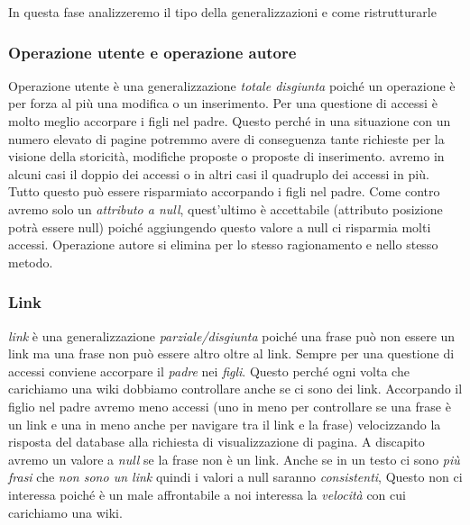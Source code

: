 In questa fase analizzeremo il tipo della generalizzazioni e come ristrutturarle

\subsubsection{Operazione utente e operazione autore}
    Operazione utente è una generalizzazione \textit{totale disgiunta} poiché un operazione è per forza al  più una modifica o un inserimento. Per una questione di accessi è molto meglio accorpare i figli nel padre. Questo perché in una situazione con un numero elevato di pagine potremmo avere di conseguenza tante richieste per la visione della storicità, modifiche proposte o proposte di inserimento. avremo in alcuni casi il doppio dei accessi o in altri casi il quadruplo dei accessi in più. Tutto questo può essere risparmiato accorpando i figli nel padre. Come contro avremo solo un \textit{attributo a null}, quest'ultimo è accettabile (attributo posizione potrà essere null) poiché aggiungendo questo valore a null ci risparmia molti accessi.\newline
    Operazione autore si elimina per lo stesso ragionamento e nello stesso metodo.
    
\subsubsection{Link}
    \textit{link} è una generalizzazione \textit{parziale/disgiunta} poiché una frase può non essere un link ma una frase non può essere altro oltre al link.
    Sempre per una questione di accessi conviene accorpare il \textit{padre} nei \textit{figli}. Questo perché ogni volta che carichiamo una wiki dobbiamo controllare anche se ci sono dei link. Accorpando il figlio nel padre avremo meno  accessi (uno in meno per controllare se una frase è un link e una in meno anche per navigare tra il link e la frase) velocizzando la risposta del database alla richiesta di visualizzazione di pagina. A discapito avremo un valore a \textit{null} se la frase non è un link. Anche se in un testo ci sono \textit{più frasi} che \textit{non sono un link} quindi i valori a null saranno \textit{consistenti}, Questo non ci interessa poiché è un male affrontabile  a noi interessa la \textit{velocità} con cui carichiamo una wiki.
    
